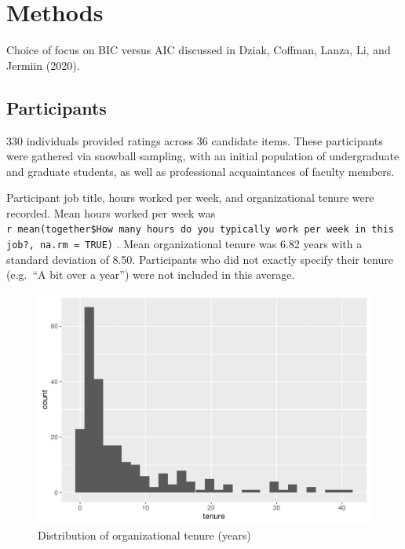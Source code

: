 \documentclass[
  english,
  man]{apa6}
\begin{document}
\hypertarget{methods}{%
\section{Methods}\label{methods}}

Choice of focus on BIC versus AIC discussed in Dziak, Coffman, Lanza, Li, and Jermiin (2020).

\hypertarget{participants}{%
\subsection{Participants}\label{participants}}

330 individuals provided ratings across 36 candidate items. These participants were gathered via snowball sampling, with an initial population of undergraduate and graduate students, as well as professional acquaintances of faculty members.

Participant job title, hours worked per week, and organizational tenure were recorded. Mean hours worked per week was \texttt{r\ mean(together\$\textasciigrave{}How\ many\ hours\ do\ you\ typically\ work\ per\ week\ in\ this\ job?\textasciigrave{},\ na.rm\ =\ TRUE)} . Mean organizational tenure was 6.82 years with a standard deviation of 8.50. Participants who did not exactly specify their tenure (e.g.~\enquote{A bit over a year}) were not included in this average.

\begin{figure}
\centering
\includegraphics{SIOPpapaja_files/figure-latex/unnamed-chunk-1-1.pdf}
\caption{\label{fig:unnamed-chunk-1}Distribution of organizational tenure (years)}
\end{figure}
\end{document}
